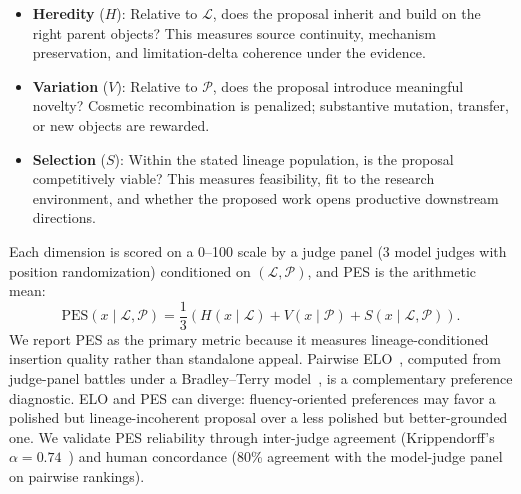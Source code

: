 \begin{itemize}[noitemsep,topsep=2pt,leftmargin=1.2em]
\item \textbf{Heredity} ($H$): Relative to $\mathcal{L}$, does the proposal inherit and build on the right parent \genome{} objects? This measures source continuity, mechanism preservation, and limitation-delta coherence under the \genomediff{} evidence.
\item \textbf{Variation} ($V$): Relative to $\mathcal{P}$, does the proposal introduce meaningful novelty? Cosmetic recombination is penalized; substantive mutation, transfer, or new \genome{} objects are rewarded.
\item \textbf{Selection} ($S$): Within the stated lineage population, is the proposal competitively viable? This measures feasibility, fit to the research environment, and whether the proposed work opens productive downstream directions.
\end{itemize}

\noindent Each dimension is scored on a 0--100 scale by a judge panel (3 model judges with position randomization) conditioned on $(\mathcal{L},\mathcal{P})$, and PES is the arithmetic mean:
\begin{equation}
\text{PES}(x \mid \mathcal{L},\mathcal{P}) =
\frac{1}{3}\left(H(x \mid \mathcal{L}) + V(x \mid \mathcal{P}) + S(x \mid \mathcal{L},\mathcal{P})\right).
\label{eq:pes}
\end{equation}
We report PES as the primary metric because it measures lineage-conditioned insertion quality rather than standalone appeal. Pairwise ELO~\citep{elo1978rating}, computed from judge-panel battles under a Bradley--Terry model~\citep{bradley1952rank}, is a complementary preference diagnostic. ELO and PES can diverge: fluency-oriented preferences may favor a polished but lineage-incoherent proposal over a less polished but better-grounded one. We validate PES reliability through inter-judge agreement (Krippendorff's $\alpha = 0.74$~\citep{krippendorff2011alpha}) and human concordance (80\% agreement with the model-judge panel on pairwise rankings).

